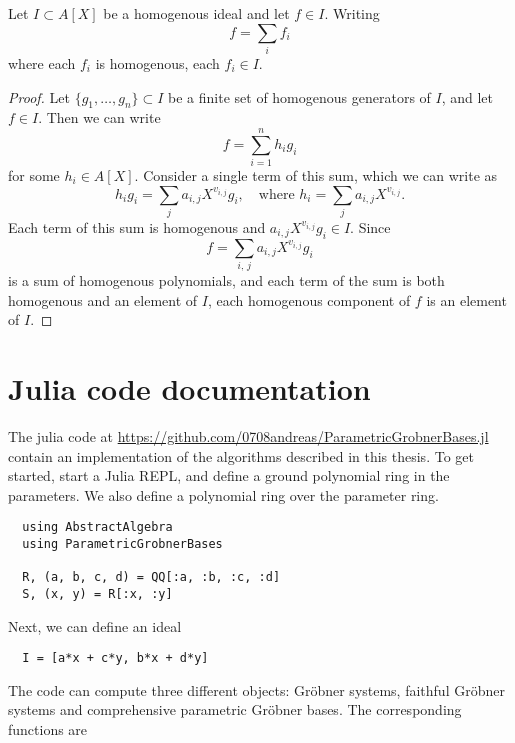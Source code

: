 \begin{lemma}\label{lem:homo_components}
  Let $I \subset A[X]$ be a homogenous ideal and let $f \in I$. Writing
  \[f = \sum_{i} f_{i}\]
  where each $f_{i}$ is homogenous, each $f_{i} \in I$.
\end{lemma}
\begin{proof}
  Let $\{g_{1}, \dots, g_{n}\} \subset I$ be a finite set of homogenous generators of $I$, and let $f \in I$. Then we can write
  \[f = \sum_{i=1}^{n} h_{i} g_{i}\]
  for some $h_{i} \in A[X]$. Consider a single term of this sum, which we can write as
  \[h_{i} g_{i} = \sum_{j} a_{i, j}X^{v_{i,j}} g_{i}, \quad \text{where } h_{i} = \sum_{j} a_{i, j}X^{v_{i,j}}.\]
  Each term of this sum is homogenous and $a_{i,j} X^{v_{i,j}} g_{i} \in I$. Since
  \[f = \sum_{i,\,j} a_{i,j} X^{v_{i, j}} g_{i}\]
  is a sum of homogenous polynomials, and each term of the sum is both homogenous and an element of $I$, each homogenous component of $f$ is an element of $I$.
\end{proof}





\section{Julia code documentation}
The julia code at \url{https://github.com/0708andreas/ParametricGrobnerBases.jl} contain an implementation of the algorithms described in this thesis. To get started, start a Julia REPL, and define a ground polynomial ring in the parameters. We also define a polynomial ring over the parameter ring.

\begin{verbatim}
  using AbstractAlgebra
  using ParametricGrobnerBases

  R, (a, b, c, d) = QQ[:a, :b, :c, :d]
  S, (x, y) = R[:x, :y]
\end{verbatim}

Next, we can define an ideal

\begin{verbatim}
  I = [a*x + c*y, b*x + d*y]
\end{verbatim}

The code can compute three different objects: Gröbner systems, faithful Gröbner systems and comprehensive parametric Gröbner bases. The corresponding functions are

